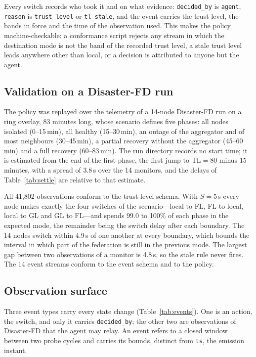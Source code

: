 Every switch records who took it and on what evidence: \texttt{decided\_by} is
\texttt{agent}, \texttt{reason} is \texttt{trust\_level} or \texttt{tl\_stale}, and the
event carries the trust level, the bands in force and the time of the observation used.
This makes the policy machine-checkable: a conformance script rejects any stream in which
the destination mode is not the band of the recorded trust level, a stale trust level leads
anywhere other than local, or a decision is attributed to anyone but the agent.

\subsection{Validation on a Disaster-FD run}
\label{sec:api-pilot}

The policy was replayed over the telemetry of a 14-node Disaster-FD run on a ring overlay,
83 minutes long, whose scenario defines five phases: all nodes isolated (0--15\,min), all
healthy (15--30\,min), an outage of the aggregator and of most neighbours (30--45\,min), a
partial recovery without the aggregator (45--60\,min) and a full recovery (60--83\,min).
The run directory records no start time; it is estimated from the end of the first phase,
the first jump to $\mathrm{TL} = 80$ minus 15 minutes, with a spread of 3.8\,s over the 14
monitors, and the delays of Table~\ref{tab:settle} are relative to that estimate.

All 41{,}802 observations conform to the trust-level schema. With $S = 5$\,s every node
makes exactly the four switches of the scenario---local to FL, FL to local, local to GL and
GL to FL---and spends 99.0 to 100\% of each phase in the expected mode, the remainder being
the switch delay after each boundary. The 14 nodes switch within 4.9\,s of one another at
every boundary, which bounds the interval in which part of the federation is still in the
previous mode. The largest gap between two observations of a monitor is 4.8\,s, so the
stale rule never fires. The 14 event streams conform to the event schema and to the policy.

\subsection{Observation surface}
\label{sec:api-events}

Three event types carry every state change (Table~\ref{tab:events}). One is an action, the
switch, and only it carries \texttt{decided\_by}; the other two are observations of
Disaster-FD that the agent may relay. An event refers to a closed window between two
probe cycles and carries its bounds, distinct from \texttt{ts}, the emission instant.

